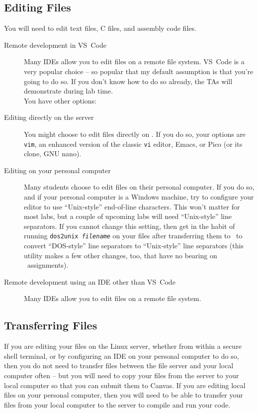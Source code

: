 \subsection{Editing Files}

You will need to edit text files, C files, and assembly code files.

\begin{description}
    \item[Remote development in VS~Code] Many IDEs allow you to edit files on a remote file system.
        VS~Code is a very popular choice -- so popular that my default assumption is that you're going to do so.
        If you don't know how to do so already, the TAs will demonstrate during lab time. \vspace{0.5cm} \\ You have other options:
    \item[Editing directly on the server] You might choose to edit files directly on \runtimeenvironment.
        If you do so, your options are \texttt{vim}, an enhanced version of the classic \texttt{vi} editor, Emacs, or Pico (or its clone, GNU nano).
    \item[Editing on your personal computer] Many students choose to edit files on their personal computer.
        If you do so, and if your personal computer is a Windows machine, try to configure your editor to use ``Unix-style'' end-of-line characters.
        This won't matter for most labs, but a couple of upcoming labs will need ``Unix-style'' line separators.
        If you cannot change this setting, then get in the habit of running \texttt{dos2unix \textit{filename}} on your files after transferring them to \runtimeenvironment\ to convert ``DOS-style'' line separators to ``Unix-style'' line separators (this utility makes a few other changes, too, that have no bearing on \coursenumber\ assignments).
    \item[Remote development using an IDE other than VS~Code] Many IDEs allow you to edit files on a remote file system.
\end{description}


\subsection{Transferring Files}

If you are editing your files on the Linux server, whether from within a secure shell terminal, or by configuring an IDE on your personal computer to do so,
then you do not need to transfer files between the file server and your local computer often -- but you will need to copy your files from the server to your local computer so that you can submit them to Canvas.
If you are editing local files on your personal computer, then you will need to be able to transfer your files from your local computer to the server to compile and run your code.

